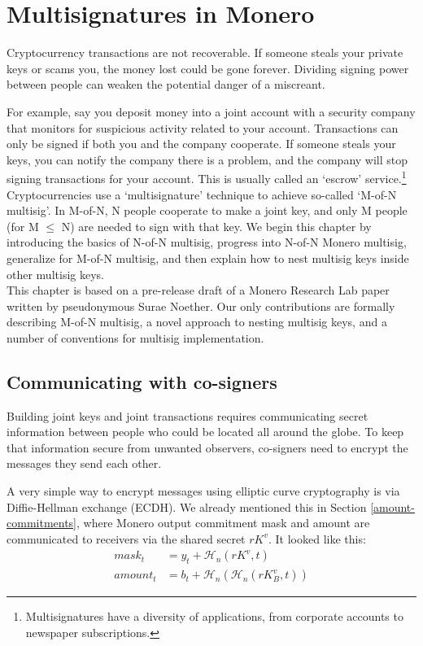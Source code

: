 \chapter{Multisignatures in Monero}
\label{chapter:multisignatures}

Cryptocurrency transactions are not recoverable. If someone steals your private keys or scams you, the money lost could be gone forever. Dividing signing power between people can weaken the potential danger of a miscreant.

For example, say you deposit money into a joint account with a security company that monitors for suspicious activity related to your account. Transactions can only be signed if both you and the company cooperate. If someone steals your keys, you can notify the company there is a problem, and the company will stop signing transactions for your account. This is usually called an `escrow' service.\footnote{Multisignatures have a diversity of applications, from corporate accounts to newspaper subscriptions.}\\

Cryptocurrencies use a `multisignature' technique to achieve so-called `M-of-N multisig'. In M-of-N, N people cooperate to make a joint key, and only M people (for M $\leq$ N) are needed to sign with that key. We begin this chapter by introducing the basics of N-of-N multisig, progress into N-of-N Monero multisig, generalize for M-of-N multisig, and then explain how to nest multisig keys inside other multisig keys.\\

This chapter is based on a pre-release draft of a Monero Research Lab paper written by pseudonymous Surae Noether. Our only contributions are formally describing M-of-N multisig, a novel approach to nesting multisig keys, and a number of conventions for multisig implementation.

\section{Communicating with co-signers}
\label{sec:communicating}

Building joint keys and joint transactions requires communicating secret information between people who could be located all around the globe. To keep that information secure from unwanted observers, co-signers need to encrypt the messages they send each other.

A very simple way to encrypt messages using elliptic curve cryptography is via Diffie-Hellman exchange (ECDH). We already mentioned this in Section \ref{amount-commitments}, where Monero output commitment mask and amount are communicated to receivers via the shared secret $r K^v$. It looked like this:
\begin{align*}
  \mathit{mask}_t     &= y_t + \mathcal{H}_n(r K^v, t) \\
  \mathit{amount}_t   &= b_t + \mathcal{H}_n(\mathcal{H}_n(r K_B^v, t))
\end{align*}

